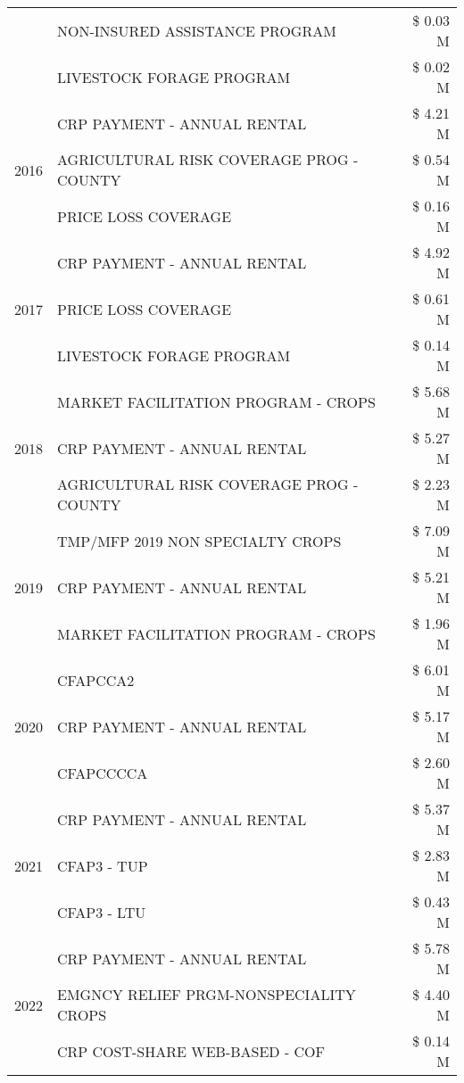 \begin{tabular}{llr}
 & NON-INSURED ASSISTANCE PROGRAM & \$ 0.03 M \\
 & LIVESTOCK FORAGE PROGRAM & \$ 0.02 M \\
\cline{1-3}
\multirow[t]{3}{*}{2016} & CRP PAYMENT - ANNUAL RENTAL & \$ 4.21 M \\
 & AGRICULTURAL RISK COVERAGE PROG - COUNTY & \$ 0.54 M \\
 & PRICE LOSS COVERAGE & \$ 0.16 M \\
\cline{1-3}
\multirow[t]{3}{*}{2017} & CRP PAYMENT - ANNUAL RENTAL & \$ 4.92 M \\
 & PRICE LOSS COVERAGE & \$ 0.61 M \\
 & LIVESTOCK FORAGE PROGRAM & \$ 0.14 M \\
\cline{1-3}
\multirow[t]{3}{*}{2018} & MARKET FACILITATION PROGRAM - CROPS & \$ 5.68 M \\
 & CRP PAYMENT - ANNUAL RENTAL & \$ 5.27 M \\
 & AGRICULTURAL RISK COVERAGE PROG - COUNTY & \$ 2.23 M \\
\cline{1-3}
\multirow[t]{3}{*}{2019} & TMP/MFP 2019 NON SPECIALTY CROPS & \$ 7.09 M \\
 & CRP PAYMENT - ANNUAL RENTAL & \$ 5.21 M \\
 & MARKET FACILITATION PROGRAM - CROPS & \$ 1.96 M \\
\cline{1-3}
\multirow[t]{3}{*}{2020} & CFAPCCA2 & \$ 6.01 M \\
 & CRP PAYMENT - ANNUAL RENTAL & \$ 5.17 M \\
 & CFAPCCCCA & \$ 2.60 M \\
\cline{1-3}
\multirow[t]{3}{*}{2021} & CRP PAYMENT - ANNUAL RENTAL & \$ 5.37 M \\
 & CFAP3 - TUP & \$ 2.83 M \\
 & CFAP3 - LTU & \$ 0.43 M \\
\cline{1-3}
\multirow[t]{3}{*}{2022} & CRP PAYMENT - ANNUAL RENTAL & \$ 5.78 M \\
 & EMGNCY RELIEF PRGM-NONSPECIALITY CROPS & \$ 4.40 M \\
 & CRP COST-SHARE WEB-BASED - COF & \$ 0.14 M \\
\cline{1-3}
\bottomrule
\end{tabular}
